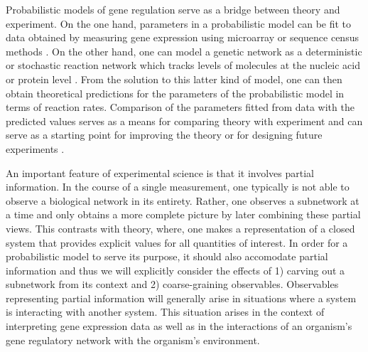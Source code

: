 Probabilistic models of gene regulation serve as a bridge between theory and experiment.  On the one hand, parameters in a probabilistic model can be fit to data obtained by measuring gene expression using microarray or sequence census methods \cite{Friedman2008a,Zhang2013}.  On the other hand, one can model a genetic network as a deterministic or stochastic reaction network which tracks levels of molecules at the nucleic acid or protein level \cite{Alon2006,Voit2012}.  From the solution to this latter kind of model, one can then obtain theoretical predictions for the parameters of the probabilistic model in terms of reaction rates.  Comparison of the parameters fitted from data with the predicted values serves as a means for comparing theory with experiment and can serve as a starting point for improving the theory or for designing future experiments \cite{Tonsing2014}.

An important feature of experimental science is that it involves partial information.  In the course of a single measurement, one typically is not able to observe a biological network in its entirety.  Rather, one observes a subnetwork at a time and only obtains a more complete picture by later combining these partial views.  This contrasts with theory, where, one makes a representation of a closed system that provides explicit values for all quantities of interest.  In order for a probabilistic model to serve its purpose, it should also accomodate partial information and thus we will explicitly consider the effects of 1) carving out a subnetwork from its context and 2) coarse-graining observables. Observables representing partial information will generally arise in situations where a system is interacting with another system. This situation arises in the context of interpreting gene expression data as well as in the interactions of an organism's gene regulatory network with the organism's environment.



